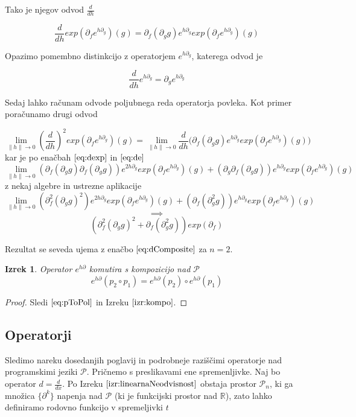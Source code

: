\documentclass{article}
\newcommand{\RR}{\mathbb{R}}
\newcommand{\dP}{\mathcal{P}}
\newcommand{\D}{\partial}
\newtheorem{izrek}{Izrek}[section]
\begin{document}
 Tako je njegov odvod $\frac{d}{dh}$
 
 \begin{equation}\label{eq:dexp}
 \frac{d}{dh}exp(\D_fe^{h\D_g})(g)=\D_f(\D_gg)e^{h\D_g}exp(\D_fe^{h\D_g})(g)
 \end{equation}
 
 Opazimo pomembno distinkcijo z operatorjem $e^{h\D_g}$, katerega odvod je
 
 \begin{equation}\label{eq:de}
\frac{d}{dh}e^{h\D_g}=\D_ge^{h\D_g}
 \end{equation}
 
 Sedaj lahko računam odvode poljubnega reda operatorja povleka. Kot primer poračunamo drugi odvod
 
 $$\lim\limits_{\lVert h\rVert\to 0}(\frac{d}{dh})^2exp(\D_fe^{h\D_g})(g)=\lim\limits_{\lVert h\rVert\to 0}\frac{d}{dh}\Big(\D_f(\D_gg)e^{h\D_g}exp(\D_fe^{h\D_g})(g)\Big)$$
 kar je po enačbah $\eqref{eq:dexp}$ in $\eqref{eq:de}$
 $$\lim\limits_{\lVert h\rVert\to 0}(\D_f(\D_gg)\D_f(\D_gg))e^{2h\D_g}exp(\D_fe^{h\D_g})(g)+(\D_g\D_f(\D_gg))e^{h\D_g}exp(\D_fe^{h\D_g})(g)$$
 z nekaj algebre in ustrezne aplikacije
 $$\lim\limits_{\lVert h\rVert\to 0}(\D^2_f(\D_gg)^2)e^{2h\D_g}exp(\D_fe^{h\D_g})(g)+(\D_f(\D^2_gg))e^{h\D_g}exp(\D_fe^{h\D_g})(g)$$
  $$\implies$$
 \begin{equation}
	(\D^2_f(\D_gg)^2+\D_f(\D^2_gg))exp(\D_f)
 \end{equation}
 
 Rezultat se seveda ujema z enačbo $\eqref{eq:dComposite}$ za $n=2$.
 
   \begin{izrek}\label{izr:komp_homo}
   Operator $e^{h\D}$ komutira s kompozicijo nad $\dP$
   \begin{equation}
   e^{h\D}(p_2\circ p_1)=e^{h\D}(p_2)\circ e^{h\D}(p_1)
   \end{equation}
   \end{izrek}
   
   \begin{proof}
   Sledi $\eqref{eq:pToPol}$ in Izreku $\ref{izr:kompo}$.
   \end{proof}
 
 \subsection{Operatorji}
 
 Sledimo nareku dosedanjih poglavij in podrobneje raziščimi operatorje nad programskimi jeziki $\dP$. Pričnemo s preslikavami ene spremenljivke. Naj bo operator $d=\frac{d}{dx}$. Po Izreku $\ref{izr:linearnaNeodvisnost}$  obstaja prostor $\dP_n$, ki ga množica $\{\D^k\}$ napenja nad $\dP$ (ki je funkcijski prostor nad $\RR$), zato lahko definiramo rodovno funkcijo v spremeljivki $t$
 
\end{document}
